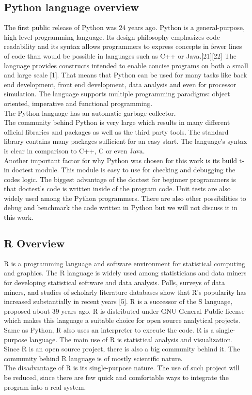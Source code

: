 \documentclass [twoside,
  11pt, a4paper,
  footinclude=true,
  headinclude=true,
  cleardoublepage=empty
]{article}
\begin{document}
\newpage
\subsection{Python language overview}
The first public release of Python was 24 years ago. Python is a general-purpose, high-level programming language. Its design philosophy emphasizes code readability and its syntax allows programmers to express concepts in fewer lines of code than would be possible in languages such as C++ or Java.[21][22] The language provides constructs intended to enable concise programs on both a small and large scale [1]. That means that Python can be used for many tasks like back end development, front end development, data analysis and even for processor simulation. The language supports multiple programming paradigms: object oriented, imperative and functional programming.\\ 
The Python language has an automatic garbage collector.\\
The community behind Python is very large which results in many different official libraries and packages as well as the third party tools. The standard library contains many packages sufficient for an easy start. The language's syntax is clear in comparison to C++, C or even Java.\\
Another important factor for why Python was chosen for this work is its build
t-in doctest module. This module is easy to use for checking and debugging the codes logic. The biggest advantage of the doctest for beginner programmers is that doctest's code is written inside of the program code. Unit tests are also widely used among the Python programmers. There are also other possibilities to debug and benchmark the code written in Python but we will not discuss it in this work.\\

\subsection{R Overview}
R is a programming language and software environment for statistical computing and graphics. The R language is widely used among statisticians and data miners for developing statistical software and data analysis. Polls, surveys of data miners, and studies of scholarly literature databases show that R's popularity has increased substantially in recent years [5]. R is a successor of the S language, proposed about 39 years ago. R is distributed under GNU General Public license which makes this language a suitable choice for open source analytical projects.\\
Same as Python, R also uses an interpreter to execute the code. R is a single-purpose language. The main use of R is statistical analysis and visualization. Since R is an open source project, there is also a big community behind it. The community behind R language is of mostly scientific nature.\\
The disadvantage of R is its single-purpose nature. The use of such project will be reduced, since there are few quick and comfortable ways to integrate the program into a real system.\\
\end{document}
